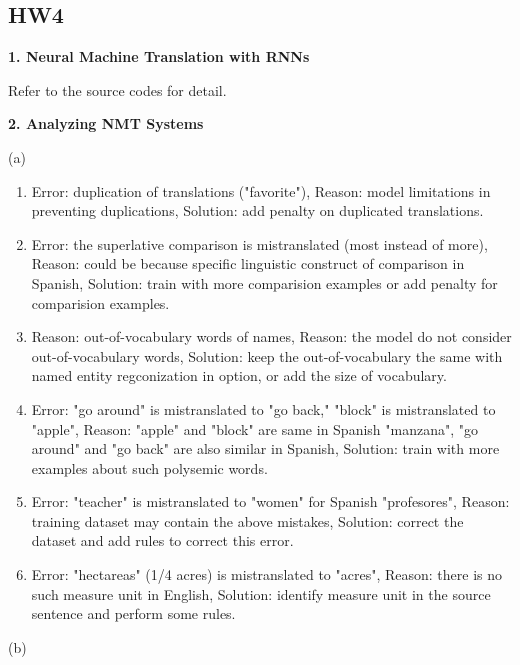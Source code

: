 \subsection{HW4}
\textbf{1. Neural Machine Translation with RNNs}

Refer to the source codes for detail.

\textbf{2. Analyzing NMT Systems}

(a)
\begin{enumerate}[label=(\roman*)]
	\item Error: duplication of translations ("favorite"), Reason: model limitations in preventing duplications, Solution: add penalty on duplicated translations.
	\item Error: the superlative comparison is mistranslated (most instead of more), Reason: could be because specific linguistic construct of comparison in Spanish, Solution: train with more comparision examples or add penalty for comparision examples.
	\item Reason: out-of-vocabulary words of names, Reason: the model do not consider out-of-vocabulary words, Solution: keep the out-of-vocabulary the same with named entity regconization in option, or add the size of vocabulary.
	\item Error: "go around" is mistranslated to "go back," "block" is mistranslated to "apple", Reason: "apple" and "block" are same in Spanish "manzana", "go around" and "go back" are also similar in Spanish, Solution: train with more examples about such polysemic words.
	\item Error: "teacher" is mistranslated to "women" for Spanish "profesores", Reason: training dataset may contain the above mistakes, Solution: correct the dataset and add rules to correct this error.
	\item Error: "hectareas" (1/4 acres) is mistranslated to "acres", Reason: there is no such measure unit in English, Solution: identify measure unit in the source sentence and perform some rules.
\end{enumerate}

(b)


